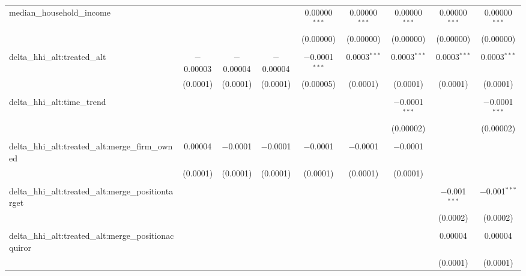 \begin{table}[H]
{\begin{tabular}{@{\extracolsep{5pt}}lcccccccc}
  median\_household\_income &  &  &  & 0.00000$^{***}$ & 0.00000$^{***}$ & 0.00000$^{***}$ & 0.00000$^{***}$ & 0.00000$^{***}$ \\  

   &  &  &  & (0.00000) & (0.00000) & (0.00000) & (0.00000) & (0.00000) \\  

   & & & & & & & & \\  

  delta\_hhi\_alt:treated\_alt & $-$0.00003 & $-$0.00004 & $-$0.00004 & $-$0.0001$^{***}$ & 0.0003$^{***}$ & 0.0003$^{***}$ & 0.0003$^{***}$ & 0.0003$^{***}$ \\  

   & (0.0001) & (0.0001) & (0.0001) & (0.00005) & (0.0001) & (0.0001) & (0.0001) & (0.0001) \\  

   & & & & & & & & \\  

  delta\_hhi\_alt:time\_trend &  &  &  &  &  & $-$0.0001$^{***}$ &  & $-$0.0001$^{***}$ \\  

   &  &  &  &  &  & (0.00002) &  & (0.00002) \\  

   & & & & & & & & \\  

  delta\_hhi\_alt:treated\_alt:merge\_firm\_owned & 0.00004 & $-$0.0001 & $-$0.0001 & $-$0.0001 & $-$0.0001 & $-$0.0001 &  &  \\  

   & (0.0001) & (0.0001) & (0.0001) & (0.0001) & (0.0001) & (0.0001) &  &  \\  

   & & & & & & & & \\  

  delta\_hhi\_alt:treated\_alt:merge\_positiontarget &  &  &  &  &  &  & $-$0.001$^{***}$ & $-$0.001$^{***}$ \\  

   &  &  &  &  &  &  & (0.0002) & (0.0002) \\  

   & & & & & & & & \\  

  delta\_hhi\_alt:treated\_alt:merge\_positionacquiror &  &  &  &  &  &  & 0.00004 & 0.00004 \\  

   &  &  &  &  &  &  & (0.0001) & (0.0001) \\  


\end{tabular}}
\end{table}
